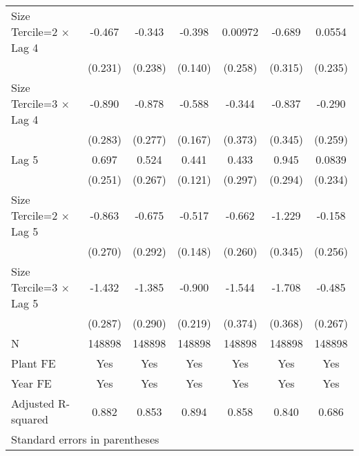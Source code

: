 \begin{table}[htbp]
\begin{tabular}{l*{6}{c}}
\addlinespace
Size Tercile=2 $\times$ Lag 4&   -0.467\sym{*}  &   -0.343         &   -0.398\sym{**} &  0.00972         &   -0.689\sym{*}  &   0.0554         \\
                &  (0.231)         &  (0.238)         &  (0.140)         &  (0.258)         &  (0.315)         &  (0.235)         \\
\addlinespace
Size Tercile=3 $\times$ Lag 4&   -0.890\sym{**} &   -0.878\sym{**} &   -0.588\sym{***}&   -0.344         &   -0.837\sym{*}  &   -0.290         \\
                &  (0.283)         &  (0.277)         &  (0.167)         &  (0.373)         &  (0.345)         &  (0.259)         \\
\addlinespace
Lag 5           &    0.697\sym{**} &    0.524\sym{*}  &    0.441\sym{***}&    0.433         &    0.945\sym{**} &   0.0839         \\
                &  (0.251)         &  (0.267)         &  (0.121)         &  (0.297)         &  (0.294)         &  (0.234)         \\
\addlinespace
Size Tercile=2 $\times$ Lag 5&   -0.863\sym{**} &   -0.675\sym{*}  &   -0.517\sym{***}&   -0.662\sym{*}  &   -1.229\sym{***}&   -0.158         \\
                &  (0.270)         &  (0.292)         &  (0.148)         &  (0.260)         &  (0.345)         &  (0.256)         \\
\addlinespace
Size Tercile=3 $\times$ Lag 5&   -1.432\sym{***}&   -1.385\sym{***}&   -0.900\sym{***}&   -1.544\sym{***}&   -1.708\sym{***}&   -0.485         \\
                &  (0.287)         &  (0.290)         &  (0.219)         &  (0.374)         &  (0.368)         &  (0.267)         \\
\midrule
N               &   148898         &   148898         &   148898         &   148898         &   148898         &   148898         \\
Plant FE        &      Yes         &      Yes         &      Yes         &      Yes         &      Yes         &      Yes         \\
Year FE         &      Yes         &      Yes         &      Yes         &      Yes         &      Yes         &      Yes         \\
Adjusted R-squared&    0.882         &    0.853         &    0.894         &    0.858         &    0.840         &    0.686         \\
\bottomrule
\multicolumn{7}{l}{\footnotesize Standard errors in parentheses}\\

\end{tabular}
\end{table}
